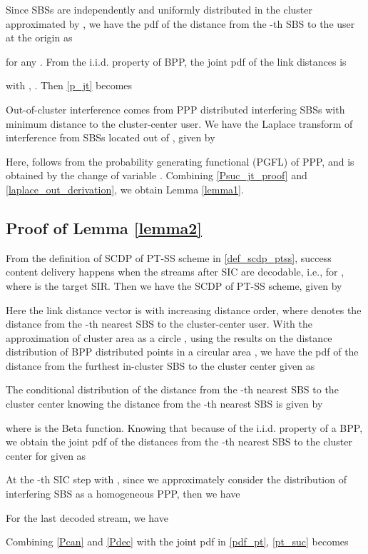 \documentclass[twocolumns,10pt]{IEEEtran}
\begin{document}
Since  SBSs are independently and uniformly distributed in the cluster approximated by , we have the pdf of the distance  from the -th SBS to the user at the origin as

for any . From the i.i.d. property of BPP, the joint pdf of the link distances  is 

with , .
Then \eqref{p_jt} becomes
 

Out-of-cluster interference comes from PPP distributed interfering SBSs with minimum distance  to the cluster-center user. We have the Laplace transform of interference from SBSs located out of , given by 

Here,  follows from the probability generating functional (PGFL) of PPP, and  is obtained by the change of variable . Combining \eqref{Psuc_jt_proof} and \eqref{laplace_out_derivation}, we obtain Lemma \ref{lemma1}.


\subsection{Proof of Lemma \ref{lemma2} }
\label{appen2}
From the definition of SCDP of PT-SS scheme in \eqref{def_scdp_ptss}, success content delivery happens when the  streams after SIC are decodable, i.e.,  for , where  is the target SIR. 
Then we have the SCDP of PT-SS scheme, given by

Here the link distance vector  is with increasing distance order, where  denotes the distance from the -th nearest SBS to the cluster-center user. With the approximation of cluster area as a circle , using the results on the distance distribution of BPP distributed points in a circular area \cite{distance_finite_network}, we have the pdf of the distance from the furthest in-cluster SBS to the cluster center given as

The conditional distribution of the distance  from the -th nearest SBS to the cluster center knowing the distance  from the -th nearest SBS is given by

where  is the Beta function.
Knowing that  because of the i.i.d. property of a BPP,
we obtain the joint pdf of the distances from the -th nearest SBS to the cluster center for  given as 
 

At the -th SIC step with , since we approximately consider the distribution of interfering SBS as a homogeneous PPP, then we have  
  
For the last decoded stream, we have

Combining \eqref{Pcan} and \eqref{Pdec}  with the joint pdf in \eqref{pdf_pt}, \eqref{pt_suc} becomes
\end{document}
